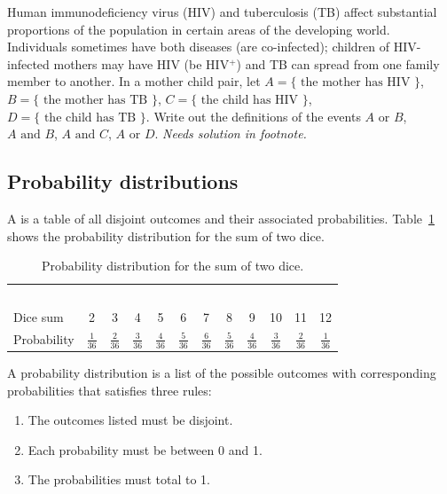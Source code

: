 \begin{doublespace}
\begin{exercise}
Human immunodeficiency virus (HIV) and tuberculosis (TB) affect substantial proportions of the population in certain areas of the developing world. Individuals sometimes have both diseases (are co-infected); children of HIV-infected mothers may have HIV (be HIV$^+$) and TB can spread from one family member to another.  In a mother child pair, let $A = \{\text{ the mother has HIV } \}$,  $B = \{\textrm{ the mother has TB } \}$, $C = \{\text{ the child has HIV } \}$,  $D = \{\text{ the child has TB } \}$.  Write out the definitions of the events $A \text{ or } B$, $A \text{ and } B$, $A \text{ and } C$, $A \text{ or } D$. \textit{Needs solution in footnote.}

\end{exercise}

\subsection{Probability distributions}

A  is a table of all disjoint outcomes and their associated probabilities. Table~\ref{diceProb} shows the probability distribution for the sum of two dice. 

\begin{table}[h] \small
\centering
\begin{tabular}{l ccc ccc ccc cc}
  \hline
  \ \vspace{-3mm} \\
Dice sum\vspace{0.3mm} & 2 & 3 & 4 & 5 & 6 & 7 & 8 & 9 & 10 & 11 & 12  \\
Probability & $\frac{1}{36}$ & $\frac{2}{36}$ & $\frac{3}{36}$ & $\frac{4}{36}$ & $\frac{5}{36}$ & $\frac{6}{36}$ & $\frac{5}{36}$ & $\frac{4}{36}$ & $\frac{3}{36}$ & $\frac{2}{36}$ & $\frac{1}{36}$\vspace{1mm} \\
   \hline
\end{tabular}
\caption{Probability distribution for the sum of two dice.}
\label{diceProb}
\end{table}

\begin{termBox}{
A probability distribution is a list of the possible outcomes with corresponding probabilities that satisfies three rules: \vspace{-2mm}
\begin{enumerate}
\setlength{\itemsep}{0mm}
\item The outcomes listed must be disjoint.
\item Each probability must be between 0 and 1.
\item The probabilities must total to 1. \vspace{1mm}
\end{enumerate}}
\end{termBox}


\end{doublespace}
